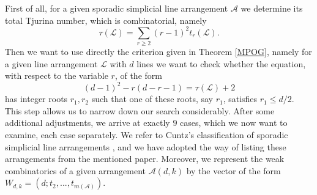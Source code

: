 \documentclass[12pt]{article}
\theoremstyle{plain}
\theoremstyle{definition}
\begin{document}
First of all, for a given sporadic simplicial line arrangement $\mathcal{A}$ we determine its total Tjurina number, which is combinatorial, namely
\begin{equation}
\tau(\mathcal{L}) = \sum_{r\geq 2}(r-1)^{2}t_{r}(\mathcal{L}).
\end{equation}
Then we want to use directly the criterion given in Theorem \ref{MPOG}, namely for a given line arrangement $\mathcal{L}$ with $d$ lines we want to check whether the equation, with respect to the variable $r$, of the form
\begin{equation}
(d-1)^{2} - r(d-r-1) = \tau(\mathcal{L})+2
\end{equation}
has integer roots $r_{1},r_{2}$ such that one of these roots, say $r_{1}$, satisfies $r_{1} \leq d/2$. This step allows us to narrow down our search considerably. After some additional adjustments, we arrive at exactly $9$ cases, which we now want to examine, each case separately. We refer to Cuntz's classification of sporadic simplicial line arrangements \cite{Cuntz}, and we have adopted the way of listing these arrangements from the mentioned paper. Moreover, we represent the weak combinatorics of a given arrangement $\mathcal{A}(d,k)$ by the vector of the form $W_{d,k} = (d;t_{2}, ..., t_{m(\mathcal{A})})$.
\end{document}
